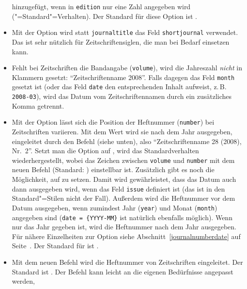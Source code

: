 \documentclass[ngerman]{scrartcl}
\begin{document}
\begin{itemize}
        hinzugefügt, wenn in \texttt{edition} nur eine Zahl angegeben wird
        (\bl"=Standard"=Verhalten). 
        Der Standard für diese Option ist .
	\item Mit
	      der Option  wird statt \texttt{journaltitle}
	      das Feld \texttt{shortjournal} verwendet. Das ist sehr nützlich für
	      Zeitschriftensiglen, die man bei Bedarf einsetzen kann.
  \item Fehlt bei Zeitschriften die Bandangabe (\texttt{volume}), wird die 
        Jahreszahl \emph{nicht} in Klammern gesetzt: 
        \enquote{Zeitschriftenname 2008}. Falls dagegen das Feld \texttt{month}
        gesetzt ist (oder das Feld \texttt{date} den entsprechenden Inhalt aufweist, z.\,B.
				\texttt{2008-03}), wird das Datum vom Zeitschriftennamen durch ein 
        zusätzliches Komma getrennt.
	\item Mit
	      der Option  lässt sich die Position der
	      Heftnummer (\texttt{number}) bei Zeitschriften variieren. Mit dem 
	      Wert  wird sie nach dem Jahr
	      ausgegeben, eingeleitet durch den Befehl  (siehe 
	      unten), also \enquote{Zeitschriftenname 28 (2008), Nr.~2}. Setzt man
	      die Option auf , wird das Standardverhalten 
	      wiederhergestellt, wobei das Zeichen zwischen \texttt{volume} und 
	      \texttt{number} mit dem neuen Befehl 
	      (Standard: ) einstellbar ist. Zusätzlich gibt es noch
	      die Möglichkeit,  auf  zu setzen.
	      Damit wird gewährleistet, dass das Datum auch dann ausgegeben wird,
	      wenn das Feld \texttt{issue} definiert ist (das ist in den 
	      Standard"=Stilen nicht der Fall). Außerdem wird die Heftnummer vor
	      dem Datum ausgegeben, wenn zumindest Jahr (\texttt{year}) und Monat
	      (\texttt{month}) angegeben sind (\texttt{date = \{YYYY-MM\}} ist natürlich
				ebenfalls möglich). Wenn nur das Jahr gegeben ist,
	      wird die Heftnummer nach dem Jahr ausgegeben. Für nähere Einzelheiten
	      zur Option  siehe 
	      Abschnitt~\ref{journalnumberdate} auf 
	      Seite~\pageref{journalnumberdate}. Der Standard für
	       ist .
	\item Mit dem neuen Befehl  wird die Heftnummer von
	      Zeitschriften eingeleitet. Der Standard ist . Der 
	      Befehl kann leicht an die eigenen Bedürfnisse angepasst werden, 

\end{itemize}
\end{document}
